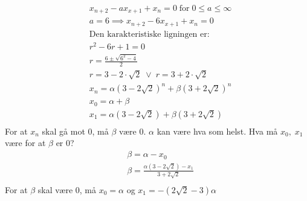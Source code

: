 \documentclass[defaultpackages]{cheatsheet}
\begin{document}
\subsubsection{}
%
\begin{align*}
&x_{n+2}\!-\!ax_{x+1}\!+\!x_n=0\;\text{for}\;0\le a\le \infty\\
&a=6 \implies x_{n+2}-6x_{x+1}+x_n=0\\
&\text{Den karakteristiske ligningen er:}\\
&r^2 - 6r + 1 = 0\\
&r = \frac{6 \pm \sqrt{6^2 - 4}}{2}\\
&r = 3 - 2\cdot \sqrt{2} \;\vee\; r = 3 + 2\cdot \sqrt{2}\\
&x_n = \alpha \left( 3 - 2 \sqrt{2} \right ) ^ n + \beta \left( 3 + 2 \sqrt{2} \right ) ^ n\\
&x_0 = \alpha + \beta\\
&x_1 = \alpha \left( 3 - 2 \sqrt{2} \right ) + \beta \left( 3 + 2 \sqrt{2} \right )\\
\end{align*}
For at $x_n$ skal gå mot 0, må $\beta$ være 0. $\alpha$ kan være hva som helst.
Hva må $x_0,\; x_1$ være for at $\beta$ er 0?\\
\begin{align*}
	&\beta = \alpha - x_0\\
	&\beta = \frac{\alpha (3-2\sqrt{2}) - x_1}{3+2\sqrt{2}}\\
\end{align*}
For at $\beta$ skal være 0, må $x_0 = \alpha$ og $x_1 = -(2\sqrt{2}  - 3) \alpha$
\end{document}
